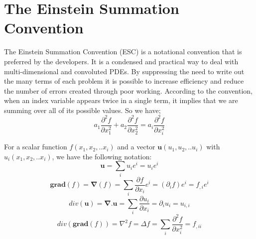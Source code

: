 
%
%
%

\chapter{The Einstein Summation Convention}

The Einstein Summation Convention (ESC) is a notational convention that is preferred by the \esc developers. It is a condensed and practical way to deal with multi-dimensional and convoluted PDEs. By suppressing the need to write out the many terms of each problem it is possible to increase efficiency and reduce the number of errors created through poor working. According to the convention, when an index variable appears twice in a single term, it implies that we are summing over all of its possible values.
So we have;
\begin{equation}
a_{1}\frac{\partial^2 f}{\partial x_{1}^2} + a_{2}\frac{\partial^2 f}{\partial x_{2}^2} = a_{i}\frac{\partial^2 f}{\partial x_{i}^2}
\end{equation}

For a scalar function $f(x_{1},x_{2},..x_{i})$ and a vector $\mathbf{u}(u_{1},u_{2},..u_{i})$ with $u_{i}(x_{1},x_{2},..x_{i})$, we have the following notation:
\begin{equation}
\mathbf{u}=\sum_{i}u_{i}e^i = u_{i}e^i
\end{equation}
\begin{equation}
\mathbf{grad}(f) = \mathbf{\nabla}(f) = \sum_{i}\frac{\partial f}{\partial x_{i}}e^i = (\partial_{i} f)e^i = f_{,i}e^i
\end{equation}
\begin{equation}
div(\mathbf{u}) = \mathbf{\nabla}.\mathbf{u} = \sum_{i}\frac{\partial u_{i}}{\partial x_{i}} = \partial_{i} u_{i} = u_{i,i}
\end{equation}
\begin{equation}
div(\mathbf{grad}(f)) = \nabla^2 f = \Delta f = \sum_{i}\frac{\partial^2 f}{\partial x_{i}^2} = f_{,ii}
\end{equation}

